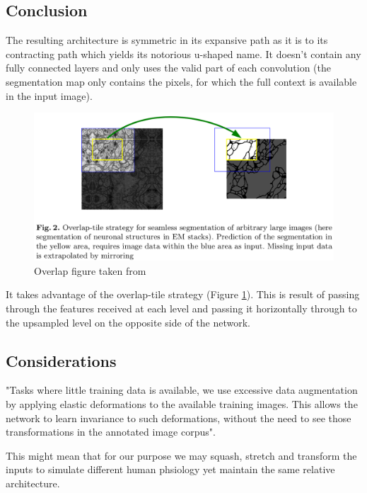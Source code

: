 \documentclass[11pt]{article}
\begin{document}
\subsection{Conclusion}

The resulting architecture is symmetric in its expansive path as it is to its contracting path which yields its notorious u-shaped name. It doesn't contain any fully connected layers and only uses the valid part of each convolution (the segmentation map only contains the pixels, for which the full context is available in the input image).

\begin{figure}[H]
    \centering
    \includegraphics[width=\linewidth]{images/overlap-tile.png}
    \caption{Overlap figure taken from~\cite{U-Net}}
    \label{fig:overlap-tile}
\end{figure}

It takes advantage of the overlap-tile strategy (Figure \ref{fig:overlap-tile}). This is result of passing through the features received at each level and passing it horizontally through to the upsampled level on the opposite side of the network.

\subsection{Considerations}

"Tasks where little training data is available, we use excessive data augmentation by applying elastic deformations to the available training images. This allows the network to learn invariance to such deformations, without the need to see those transformations in the annotated image corpus".

This might mean that for our purpose we may squash, stretch and transform the inputs to simulate different human phsiology yet maintain the same relative architecture.
\end{document}
